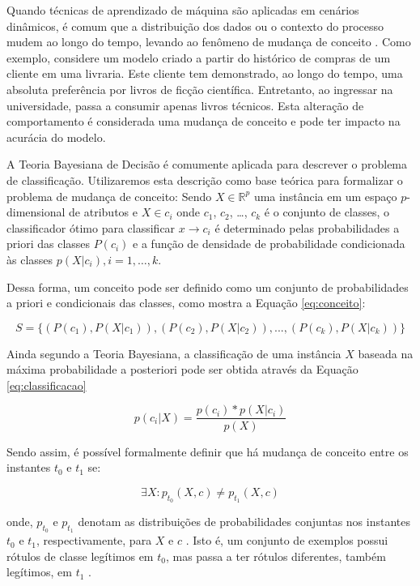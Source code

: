 \documentclass[qual, classic, a4paper]{ufbathesis}
\begin{document}
Quando técnicas de aprendizado de máquina são aplicadas em cenários dinâmicos, é comum que a distribuição dos dados ou o contexto do processo mudem ao longo do tempo, levando ao fenômeno de mudança de conceito \cite{Schlimmer1986}.
Como exemplo, considere um modelo criado a partir do histórico de compras de um cliente em uma livraria.
Este cliente tem demonstrado, ao longo do tempo, uma absoluta preferência por livros de ficção científica.
Entretanto, ao ingressar na universidade, passa a consumir apenas livros técnicos.
Esta alteração de comportamento é considerada uma mudança de conceito e pode ter impacto na acurácia do modelo.

A Teoria Bayesiana de Decisão \cite{Duda:2000:PC:954544} é comumente aplicada para descrever o problema de classificação.
Utilizaremos esta descrição como base teórica para formalizar o problema de mudança de conceito:
Sendo $X \in \mathbb{R}^p$ uma instância em um espaço $p$-dimensional de atributos e $X \in c_i$ onde $c_1$, $c_2$, \ldots, $c_k$ é o conjunto de classes, 
o classificador ótimo para classificar $x \rightarrow c_i$ é determinado pelas probabilidades a priori das classes $P(c_i)$ e a função de densidade de probabilidade condicionada às classes $p(X|c_i), i = 1, \ldots, k$.

Dessa forma, um conceito pode ser definido como um conjunto de probabilidades a priori e condicionais das classes, como mostra a Equação \ref{eq:conceito}:

\begin{equation} \label{eq:conceito}
    S = \{(P(c_1), P(X|c_1)), (P(c_2), P(X|c_2)), ..., (P(c_k), P(X|c_k))\}
\end{equation}

Ainda segundo a Teoria Bayesiana, a classificação de uma instância $X$ baseada na máxima probabilidade a posteriori pode ser obtida através da Equação \ref{eq:classificacao}

\begin{equation} \label{eq:classificacao}
    p(c_i|X) = \frac{p(c_i) * p(X|c_i)}{p(X)}
\end{equation}

Sendo assim, é possível formalmente definir que há mudança de conceito entre os instantes $t_0$ e $t_1$ se:

\begin{equation} \label{eq:3}
    {\exists}X : p_{t_0}(X, c) \ne p_{t_1}(X, c)
\end{equation}

onde, $p_{t_0}$ e $p_{t_1}$ denotam as distribuições de probabilidades conjuntas nos instantes $t_0$ e $t_1$, respectivamente, 
para $X$ e $c$ \cite{Gama:2014:SCD:2597757.2523813}. 
Isto é, um conjunto de exemplos possui rótulos de classe legítimos em $t_0$, mas passa a ter rótulos diferentes, também legítimos, em $t_1$ \cite{Kolter:2007:DWM:1314498.1390333}.
\end{document}
